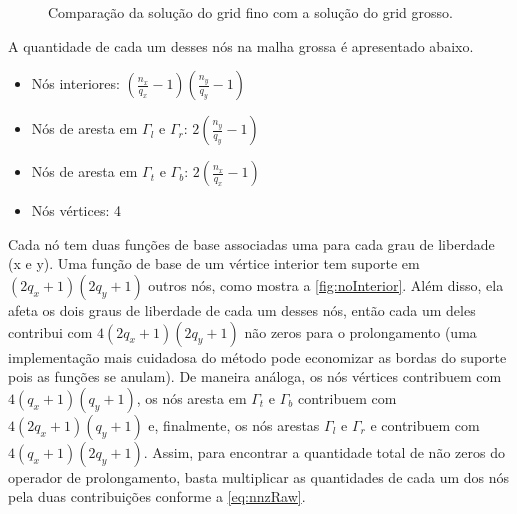 \begin{figure}[h]

\caption{Comparação da solução do grid fino com a solução do grid grosso.  }
\label{fig:verticesTypes}
\end{figure}

A quantidade de cada um desses nós na malha grossa é apresentado abaixo.

\begin{itemize}
    \item Nós interiores: $(\frac{n_x}{q_x} - 1) (\frac{n_y}{q_y} - 1)$
    \item Nós de aresta em $\Gamma_l$ e $\Gamma_r$: $2 ( \frac{n_y}{q_y} - 1)$
    \item Nós de aresta em $\Gamma_t$ e $\Gamma_b$: $2 ( \frac{n_x}{q_x} - 1)$
    \item Nós vértices: 4 
\end{itemize}


Cada nó tem duas funções de base associadas uma para cada grau de liberdade (x e y). Uma função de base de um vértice interior tem suporte  em $(2q_x+1)(2q_y+1)$ outros nós, como mostra a \ref{fig:noInterior}. Além disso, ela afeta os dois graus de liberdade de cada um desses nós, então cada um deles contribui com $4(2q_x+1)(2q_y+1)$  não zeros para o prolongamento (uma implementação mais cuidadosa do método pode economizar as bordas do suporte pois as funções se anulam). De maneira análoga, os nós vértices contribuem com $ 4 (q_x+1)(q_y+1)$, os nós aresta em $\Gamma_t$ e $\Gamma_b$ contribuem com $ 4 (2q_x+1)(q_y+1) $ e, finalmente, os nós arestas  $\Gamma_l$ e $\Gamma_r$ e contribuem com $ 4(q_x+1)(2q_y+1) $. Assim, para encontrar a quantidade total de não zeros do operador de prolongamento, basta multiplicar as quantidades de cada um dos nós pela duas contribuições conforme a   \eqref{eq:nnzRaw}. 



